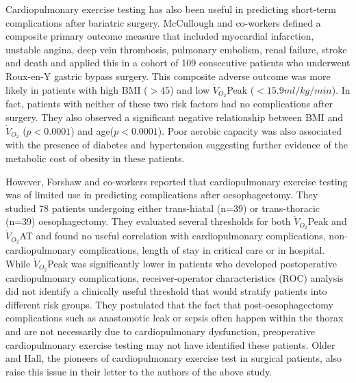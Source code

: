 Cardiopulmonary exercise testing has also been useful in predicting short-term complications after bariatric surgery. McCullough and co-workers defined a composite primary outcome measure that included myocardial infarction, unstable angina, deep vein thrombosis, pulmonary embolism, renal failure, stroke and death and applied this in a cohort of 109 consecutive patients who underwent Roux-en-Y gastric bypass surgery. This composite adverse outcome was more likely in patients with high BMI ($>45$) and low $\dot{V}_{O_2}$Peak ($<15.9 ml/kg/min$). In fact, patients with neither of these two risk factors had no complications after surgery. They also observed a significant negative relationship between BMI and $\dot{V}_{O_2}$ ($p<0.0001$) and age($p<0.0001$). Poor aerobic capacity was also associated with the presence of diabetes and hypertension suggesting further evidence of the metabolic cost of obesity in these patients.\parencite{mccullough_cardiorespiratory_2006}

However, Forshaw and co-workers reported that cardiopulmonary exercise testing was of limited use in predicting complications after oesophagectomy.\parencite{forshaw_is_2008} They studied 78 patients undergoing either trans-hiatal (n=39) or trans-thoracic (n=39) oesophagectomy. They evaluated several thresholds for both $\dot{V}_{O_2}$Peak and $\dot{V}_{O_2}$AT and found no useful correlation with cardiopulmonary complications, non-cardiopulmonary complications, length of stay in critical care or in hospital. While $\dot{V}_{O_2}$Peak was significantly lower in patients who developed postoperative cardiopulmonary complications, receiver-operator characteristics (ROC) analysis did not identify a clinically useful threshold that would stratify patients into different risk groups. They postulated that the fact that post-oesophagectomy complications such as anastomotic leak or sepsis often happen within the thorax and are not necessarily due to cardiopulmonary dysfunction, preoperative cardiopulmonary exercise testing may not have identified these patients. Older and Hall, the pioneers of cardiopulmonary exercise test in surgical patients, also raise this issue in their letter to the authors of the above study. \parencite{hall_cardiopulmonary_2009}

